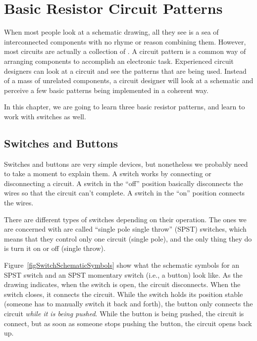 \chapter{Basic Resistor Circuit Patterns}
\label{chapBasicResistorCircuits}

When most people look at a schematic drawing, all they see is a sea of interconnected components with no rhyme or reason combining them.
However, most circuits are actually a collection of .
A circuit pattern is a common way of arranging components to accomplish an electronic task.
Experienced circuit designers can look at a circuit and see the patterns that are being used.
Instead of a mass of unrelated components, a circuit designer will look at a schematic and perceive a few basic patterns being implemented in a coherent way.

In this chapter, we are going to learn three basic resistor patterns, and learn to work with switches as well.

\section{Switches and Buttons}

Switches and buttons are very simple devices, but nonetheless we probably need to take a moment to explain them.
A switch works by connecting or disconnecting a circuit.
A switch in the ``off'' position basically disconnects the wires so that the circuit can't complete.
A switch in the ``on'' position connects the wires.

There are different types of switches depending on their operation.
The ones we are concerned with are called ``single pole single throw'' (SPST) switches, which means that they control only one circuit (single pole), and the only thing they do is turn it on or off (single throw).


Figure~\ref{figSwitchSchematicSymbols} show what the schematic symbols for an SPST switch and an SPST momentary switch (i.e., a button) look like.
As the drawing indicates, when the switch is open, the circuit disconnects.
When the switch closes, it connects the circuit.
While the switch holds its position stable (someone has to manually switch it back and forth), the button only connects the circuit \emph{while it is being pushed}.  
While the button is being pushed, the circuit is connect, but as soon as someone stops pushing the button, the circuit opens back up.

